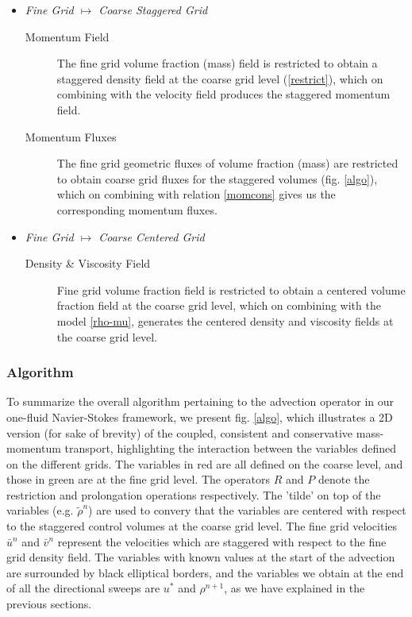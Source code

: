 \begin{itemize}

	\item \textit{Fine Grid $\longmapsto$ Coarse Staggered Grid}
          
	  \begin{description}
		  \item[Momentum Field] The fine grid volume fraction (mass) field is restricted to obtain a staggered density field at the coarse grid level (\ref{restrict}), which on combining with the velocity field produces the staggered momentum field.    
		\item[Momentum Fluxes] The fine grid geometric fluxes of volume fraction (mass) are restricted to obtain coarse grid fluxes for the staggered volumes (fig. \ref{algo}), which on combining with relation \ref{momcons} gives us the corresponding momentum fluxes.   
	  \end{description}

  \item \textit{Fine Grid $\longmapsto$ Coarse Centered Grid}

          \begin{description}
		  \item[Density \& Viscosity Field] Fine grid volume fraction field is restricted to obtain a centered volume fraction field at the coarse grid level, which on combining with the model \ref{rho-mu}, generates the centered density and viscosity fields at the coarse grid level.   
	  \end{description}

\end{itemize}



\subsubsection*{Algorithm}

To summarize the overall algorithm pertaining to the advection operator in our one-fluid Navier-Stokes framework, we present fig. \ref{algo}, which illustrates a 2D version (for sake of brevity) of the coupled, consistent and conservative mass-momentum transport, highlighting the interaction between the variables defined on the different grids. The variables in red are all defined on the coarse level, and those in green are at the fine grid level. The operators $R$ and $P$ denote the restriction and prolongation operations respectively. The 'tilde' on top of the variables (e.g. $\tilde{\rho}^{n} $) are used to convery that the variables are centered with respect to the staggered control volumes at the coarse grid level. The fine grid velocities $\bar{u}^{n}$ and $\bar{v}^{n}$ represent the velocities which are staggered with respect to the fine grid density field. The variables with known values at the start of the advection are surrounded by black elliptical borders, and the variables we obtain at the end of all the directional sweeps are $u^{*}$ and $\rho^{n+1}$, as we have explained in the previous sections. 

